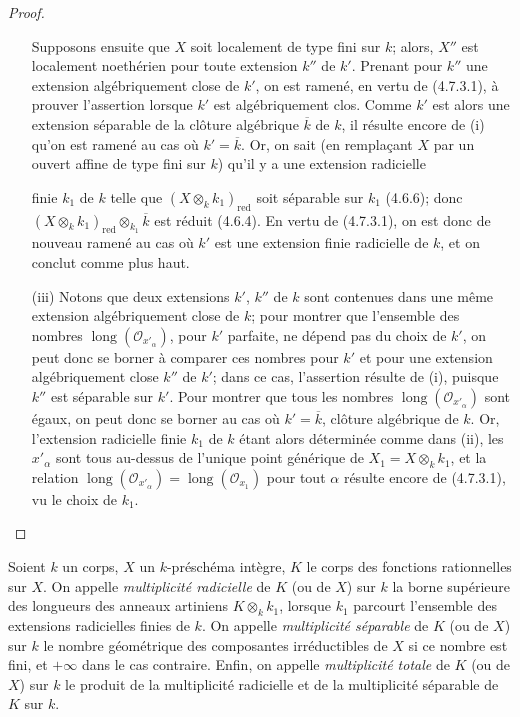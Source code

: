 \begin{proof}
\begin{enumerate}
Supposons ensuite que $X$ soit localement de type fini sur $k$; alors, $X''$
est localement noethérien pour toute extension $k''$ de $k'$. Prenant pour
$k''$ une extension algébriquement close de $k'$, on est ramené, en vertu de
(4.7.3.1), à prouver l'assertion lorsque $k'$ est algébriquement clos. Comme
$k'$ est alors une extension séparable de la clôture algébrique $\overline k$
de $k$, il résulte encore de (i) qu'on est ramené au cas où
$k'=\overline k$. Or, on sait (en remplaçant $X$ par un ouvert affine de type
fini sur $k$) qu'il y a une extension radicielle


finie $k_1$ de $k$ telle que
$(X\otimes_k k_1)_{\mathrm{red}}$ soit séparable sur $k_1$ (4.6.6); donc
$(X\otimes_k k_1)_{\mathrm{red}}\otimes_{k_1}\overline k$ est réduit
(4.6.4). En vertu de (4.7.3.1), on est donc de nouveau ramené au cas où $k'$
est une extension finie radicielle de $k$, et on conclut comme plus haut.

\item[(iii)] Notons que deux extensions $k'$, $k''$ de $k$ sont contenues
dans une même extension algébriquement close de $k$; pour montrer que
l'ensemble des nombres $\operatorname{long}(\mathcal O_{x'_\alpha})$, pour
$k'$ parfaite, ne dépend pas du choix de $k'$, on peut donc se borner à
comparer ces nombres pour $k'$ et pour une extension algébriquement close
$k''$ de $k'$; dans ce cas, l'assertion résulte de (i), puisque $k''$ est
séparable sur $k'$. Pour montrer que tous les nombres
$\operatorname{long}(\mathcal O_{x'_\alpha})$ sont égaux, on peut donc se
borner au cas où $k'=\overline k$, clôture algébrique de $k$. Or, l'extension
radicielle finie $k_1$ de $k$ étant alors déterminée comme dans (ii), les
$x'_\alpha$ sont tous au-dessus de l'unique point générique de
$X_1=X\otimes_k k_1$, et la relation
$\operatorname{long}(\mathcal O_{x'_\alpha})=
\operatorname{long}(\mathcal O_{x_1})$ pour tout $\alpha$ résulte encore de
(4.7.3.1), vu le choix de $k_1$.
\end{enumerate}
\end{proof}

\begin{definition}[4.7.4]
\label{IV.2.4.7.4-fr}
Soient $k$ un corps, $X$ un $k$-préschéma intègre, $K$ le corps des fonctions
rationnelles sur $X$. On appelle \emph{multiplicité radicielle} de $K$ (ou de
$X$) sur $k$ la borne supérieure des longueurs des anneaux artiniens
$K\otimes_k k_1$, lorsque $k_1$ parcourt l'ensemble des extensions
radicielles finies de $k$. On appelle \emph{multiplicité séparable} de $K$ (ou
de $X$) sur $k$ le nombre géométrique des composantes irréductibles de $X$ si
ce nombre est fini, et $+\infty$ dans le cas contraire. Enfin, on appelle
\emph{multiplicité totale} de $K$ (ou de $X$) sur $k$ le produit de la
multiplicité radicielle et de la multiplicité séparable de $K$ sur $k$.
\end{definition}

